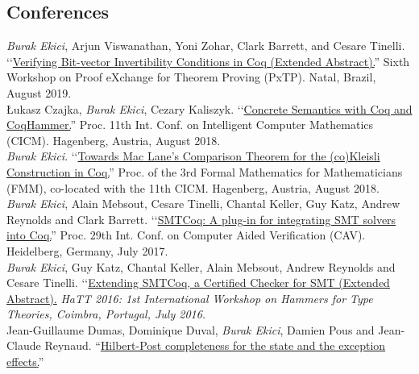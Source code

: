 \documentclass[10pt, a4paper]{article}
\newcommand{\years}[1]{\marginnote{\scriptsize #1}}
\begin{document}
\subsection*{Conferences}
\years{\normalsize2019}
\emph{Burak Ekici}, Arjun Viswanathan, Yoni Zohar, Clark Barrett, and Cesare
Tinelli.
\lq\lq{\href{http://pxtp.gforge.inria.fr/2019/papers/PxTP_2019_paper_5.pdf}{Verifying Bit-vector Invertibility Conditions in Coq (Extended Abstract).}}''
Sixth Workshop on Proof eXchange for Theorem Proving (PxTP). Natal, Brazil, August 2019.
\\[0.25cm]
\years{\normalsize2018}
\L ukasz Czajka, \emph{Burak Ekici}, Cezary Kaliszyk.
\lq\lq{\href{https://www.mimuw.edu.pl/~lukaszcz/cicm2018.pdf}{Concrete Semantics with Coq and CoqHammer.}}''
Proc. 11th Int. Conf. on Intelligent Computer Mathematics (CICM). Hagenberg, Austria, August 2018.
\\[0.25cm]
\years{\normalsize2018}
\emph{Burak Ekici}.
\lq\lq{\href{https://www.cicm-conference.org/2018/infproc/paper11.pdf}{Towards Mac Lane's Comparison Theorem for the (co)Kleisli Construction in Coq.}}''
Proc. of the 3rd Formal Mathematics for Mathematicians (FMM), co-located with the 11th CICM. Hagenberg, Austria, August 2018.
\\[0.25cm]
\years{\normalsize2017}
\emph{Burak Ekici}, Alain Mebsout, Cesare Tinelli,
Chantal Keller, Guy Katz, Andrew Reynolds and Clark Barrett. 
\lq\lq{\href{http://homepage.divms.uiowa.edu/~tinelli/papers/EkiEtAl-CAV-17.pdf}{SMTCoq: A plug-in for integrating SMT solvers into Coq.}}''
Proc. 29th Int. Conf. on Computer Aided Verification (CAV). Heidelberg, Germany, July 2017.
\\[0.25cm]
\years{\normalsize2016}
\emph{Burak Ekici}, Guy Katz, Chantal Keller, Alain Mebsout, Andrew Reynolds and Cesare Tinelli.
\lq\lq{\href{http://eptcs.web.cse.unsw.edu.au/paper.cgi?HaTT2016.5}{Extending SMTCoq, a Certified Checker for SMT (Extended Abstract).}}
\emph{HaTT 2016: 1st International Workshop on Hammers for Type Theories, Coimbra, Portugal, July 2016.}
\\[0.25cm]
\years{\normalsize2015}
Jean-Guillaume Dumas, Dominique Duval, \emph{Burak Ekici}, Damien Pous and Jean-Claude Reynaud. ``\href{https://hal.archives-ouvertes.fr/hal-01121924}{Hilbert-Post completeness for the state and the exception effects.}''
\end{document}
